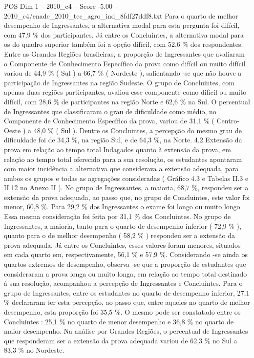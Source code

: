 \begin{textsample}{POS Dim 1 – 2010\_c4 – Score -5.00 – 2010\_c4/enade\_2010\_tec\_agro\_ind\_8fdf27ddf8.txt}
Para o quarto de melhor desempenho de Ingressantes, a alternativa modal para esta pergunta foi difícil, com 47,9 \% dos participantes.
Já entre os Concluintes, a alternativa modal para os do quadro superior também foi a opção difícil, com 52,6 \% dos respondentes.
Entre as Grandes Regiões brasileiras, a proporção de Ingressantes que avaliaram o Componente de Conhecimento Específico da prova como difícil ou muito difícil variou de 44,9 \% ( Sul ) a 66,7 \% ( Nordeste ), salientando -se que não houve a participação de Ingressantes na região Sudeste.
O grupo de Concluintes, com apenas duas regiões participantes, avaliou esse componente como difícil ou muito difícil, com 28,6 \% de participantes na região Norte e 62,6 \% na Sul.
O percentual de Ingressantes que classificaram o grau de dificuldade como médio, no Componente de Conhecimento Específico da prova, variou de 31,1 \% ( Centro-Oeste ) a 48,0 \% ( Sul ).
Dentre os Concluintes, a percepção do mesmo grau de dificuldade foi de 34,3 \%, na região Sul, e de 64,3 \%, na Norte. 4.2 Extensão da prova em relação ao tempo total Indagados quanto à extensão da prova, em relação ao tempo total oferecido para a sua resolução, os estudantes apontaram com maior incidência a alternativa que considerava a extensão adequada, para ambos os grupos e todas as agregações consideradas ( Gráfico 4.3 e Tabelas II.3 e II.12 no Anexo II ).
No grupo de Ingressantes, a maioria, 68,7 \%, respondeu ser a extensão da prova adequada, ao passo que, no grupo de Concluintes, este valor foi menor, 60,8 \%.
Para 29,2 \% dos Ingressantes o exame foi longo ou muito longo.
Essa mesma consideração foi feita por 31,1 \% dos Concluintes.
No grupo de Ingressantes, a maioria, tanto para o quarto de desempenho inferior ( 72,9 \% ), quanto para o de melhor desempenho ( 58,2 \% ) respondeu ser a extensão da prova adequada.
Já entre os Concluintes, esses valores foram menores, situados em cada quarto em, respectivamente, 56,1 \% e 57,9 \%.
Considerando -se ainda os quartos extremos de desempenho, observa -se que a proporção de estudantes que consideraram a prova longa ou muito longa, em relação ao tempo total destinado à sua resolução, acompanhou a percepção de Ingressantes e Concluintes.
Para o grupo de Ingressantes, entre os estudantes no quarto de desempenho inferior, 27,1 \% declararam ter esta percepção, ao passo que, entre aqueles no quarto de melhor desempenho, esta proporção foi 35,5 \%.
O mesmo pode ser constatado entre os Concluintes : 25,1 \% no quarto de menor desempenho e 36,8 \% no quarto de maior desempenho.
Na análise por Grandes Regiões, o percentual de Ingressantes que responderam ser a extensão da prova adequada variou de 62,3 \% no Sul a 83,3 \% no Nordeste.

\end{textsample}
